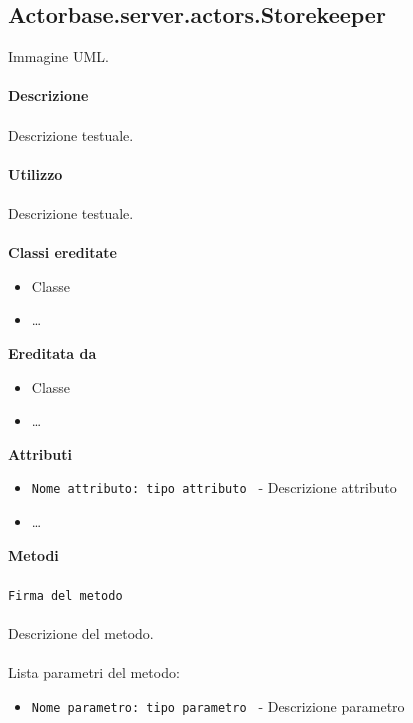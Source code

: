 \documentclass[a4paper]{article}
\begin{document}
	\subsection{Actorbase.server.actors.Storekeeper}
		Immagine UML.
		\\ \\
		\textbf{Descrizione}
			\\ \\
			Descrizione testuale.
			\\ \\
		\textbf{Utilizzo}
			\\ \\
			Descrizione testuale.
			\\ \\
		\textbf{Classi ereditate}
			\begin{itemize}
				\item Classe
				\item \dots
			\end{itemize}
		\textbf{Ereditata da}
			\begin{itemize}
				\item Classe
				\item \dots
			\end{itemize}
		\textbf{Attributi}
			\begin{itemize}
				\item \texttt{Nome attributo: tipo attributo } - Descrizione attributo
				\item \dots
			\end{itemize}
		\textbf{Metodi}
			\\ \\
			\texttt{Firma del metodo}
			\\ \\
			Descrizione del metodo.
			\\ \\
			Lista parametri del metodo:
			\begin{itemize}
				\item \texttt{Nome parametro: tipo parametro } - Descrizione parametro
			\end{itemize}
			
\end{document}

